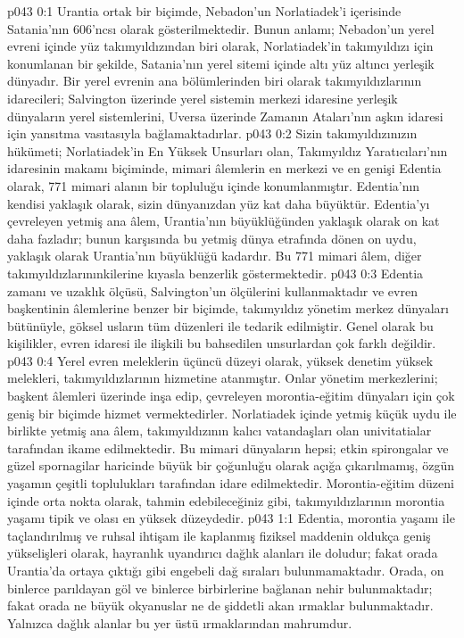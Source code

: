 \vs p043 0:1 Urantia ortak bir biçimde, Nebadon’un Norlatiadek’i içerisinde Satania’nın 606’ncsı olarak gösterilmektedir. Bunun anlamı; Nebadon’un yerel evreni içinde yüz takımyıldızından biri olarak, Norlatiadek’in takımyıldızı için konumlanan bir şekilde, Satania’nın yerel sitemi içinde altı yüz altıncı yerleşik dünyadır. Bir yerel evrenin ana bölümlerinden biri olarak takımyıldızlarının idarecileri; Salvington üzerinde yerel sistemin merkezi idaresine yerleşik dünyaların yerel sistemlerini, Uversa üzerinde Zamanın Ataları’nın aşkın idaresi için yansıtma vasıtasıyla bağlamaktadırlar.
\vs p043 0:2 Sizin takımyıldızınızın hükümeti; Norlatiadek’in En Yüksek Unsurları olan, Takımyıldız Yaratıcıları’nın idaresinin makamı biçiminde, mimari âlemlerin en merkezi ve en genişi Edentia olarak, 771 mimari alanın bir topluluğu içinde konumlanmıştır. Edentia’nın kendisi yaklaşık olarak, sizin dünyanızdan yüz kat daha büyüktür. Edentia’yı çevreleyen yetmiş ana âlem, Urantia’nın büyüklüğünden yaklaşık olarak on kat daha fazladır; bunun karşısında bu yetmiş dünya etrafında dönen on uydu, yaklaşık olarak Urantia’nın büyüklüğü kadardır. Bu 771 mimari âlem, diğer takımyıldızlarınınkilerine kıyasla benzerlik göstermektedir.
\vs p043 0:3 Edentia zamanı ve uzaklık ölçüsü, Salvington’un ölçülerini kullanmaktadır ve evren başkentinin âlemlerine benzer bir biçimde, takımyıldız yönetim merkez dünyaları bütünüyle, göksel usların tüm düzenleri ile tedarik edilmiştir. Genel olarak bu kişilikler, evren idaresi ile ilişkili bu bahsedilen unsurlardan çok farklı değildir.
\vs p043 0:4 Yerel evren meleklerin üçüncü düzeyi olarak, yüksek denetim yüksek melekleri, takımyıldızlarının hizmetine atanmıştır. Onlar yönetim merkezlerini; başkent âlemleri üzerinde inşa edip, çevreleyen morontia\hyp{}eğitim dünyaları için çok geniş bir biçimde hizmet vermektedirler. Norlatiadek içinde yetmiş küçük uydu ile birlikte yetmiş ana âlem, takımyıldızının kalıcı vatandaşları olan univitatialar tarafından ikame edilmektedir. Bu mimari dünyaların hepsi; etkin spirongalar ve güzel spornagilar haricinde büyük bir çoğunluğu olarak açığa çıkarılmamış, özgün yaşamın çeşitli toplulukları tarafından idare edilmektedir. Morontia\hyp{}eğitim düzeni içinde orta nokta olarak, tahmin edebileceğiniz gibi, takımyıldızlarının morontia yaşamı tipik ve olası en yüksek düzeydedir.
\vs p043 1:1 Edentia, morontia yaşamı ile taçlandırılmış ve ruhsal ihtişam ile kaplanmış fiziksel maddenin oldukça geniş yükselişleri olarak, hayranlık uyandırıcı dağlık alanları ile doludur; fakat orada Urantia’da ortaya çıktığı gibi engebeli dağ sıraları bulunmamaktadır. Orada, on binlerce parıldayan göl ve binlerce birbirlerine bağlanan nehir bulunmaktadır; fakat orada ne büyük okyanuslar ne de şiddetli akan ırmaklar bulunmaktadır. Yalnızca dağlık alanlar bu yer üstü ırmaklarından mahrumdur.
